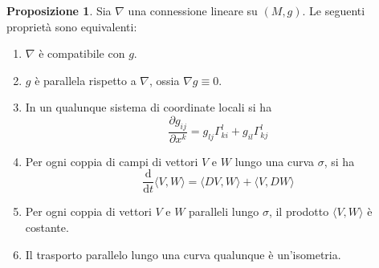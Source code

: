 \documentclass[a4paper,11pt]{article}
\theoremstyle{definition}
\theoremstyle{theorem}
\newtheorem{proposizione}{Proposizione}[section]
\newcommand{\dif}{\mathrm{d}}
\begin{document}
\begin{proposizione}
	Sia $\nabla$ una connessione lineare su $(M,g)$. Le seguenti proprietà sono equivalenti:
	\begin{enumerate}
		\item $\nabla$ è compatibile con $g$.
		\item $g$ è parallela rispetto a $\nabla$, ossia $\nabla g\equiv0$.
		\item In un qualunque sistema di coordinate locali si ha
		\[\frac{\partial g_{ij}}{\partial x^k}=g_{lj}\Gamma^{l}_{ki}+g_{il}\Gamma^{l}_{kj}\]
		\item Per ogni coppia di campi di vettori $V$ e $W$ lungo una curva $\sigma$, si ha
		\[\frac{\dif}{\dif t}\langle V,W\rangle=\langle DV,W\rangle+\langle V,DW\rangle\]
		\item Per ogni coppia di vettori $V$ e $W$ paralleli lungo $\sigma$, il prodotto $\langle V,W\rangle$ è costante.
		\item Il trasporto parallelo lungo una curva qualunque è un'isometria.
	\end{enumerate}
\end{proposizione}
\end{document}
